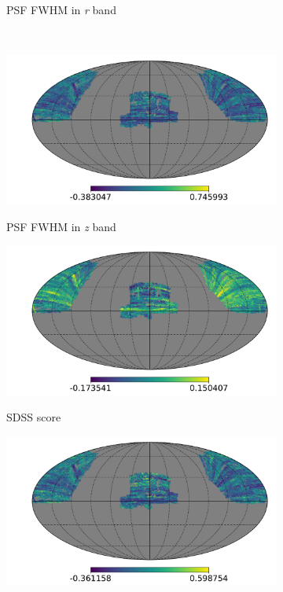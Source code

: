 \begin{figure}
\begin{subfigure}{.33\textwidth}
	\label{fig:systmap2}
    \caption{PSF FWHM in \textit{r} band}
\end{subfigure}
\\
\begin{subfigure}{.33\textwidth}
  \centering
	\centering
    \includegraphics[scale=0.214]{SystematicMaps2/map_sdss_dr12_systematics_psffwhmz.pdf}
	\label{fig:systmap4}
    \caption{PSF FWHM in \textit{z} band}
\end{subfigure}
\begin{subfigure}{.33\textwidth}
  \centering
	\centering
    \includegraphics[scale=0.214]{SystematicMaps2/map_sdss_dr12_systematics_score.pdf}
    \label{fig:systmap5}
    \caption{SDSS score}
\end{subfigure}
\begin{subfigure}{.33\textwidth}
  \centering
	\centering
    \includegraphics[scale=0.214]{SystematicMaps2/map_sdss_dr12_systematics_psffwhmg.pdf}

\end{subfigure}
\end{figure}
